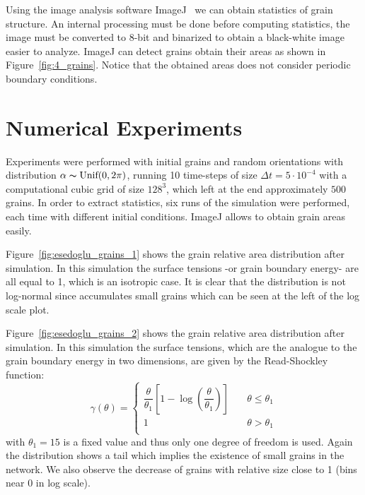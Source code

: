 Using the image analysis software ImageJ~\cite{schneider2012nih} we can obtain statistics of grain structure. 
An internal processing must be done before computing statistics, the image must be converted to 8-bit and binarized to obtain a black-white image easier to analyze. 
ImageJ can detect grains obtain their areas as shown in Figure~\ref{fig:4_grains}. 
Notice that the obtained areas does not consider periodic boundary conditions.

\section{Numerical Experiments}

Experiments were performed with  initial grains and  random orientations with distribution $\alpha \thicksim \text{Unif}(0,2\pi)$, running 10 time-steps of size $\Delta t = 5\cdot10^{-4}$ with a computational cubic grid of size $128^3$, which left at the end approximately $500$ grains. 
In order to extract statistics, six runs of the simulation were performed, each time with different initial conditions. 
ImageJ allows to obtain grain areas easily.

Figure~\ref{fig:esedoglu_grains_1} shows the grain relative area distribution after simulation. 
In this simulation the surface tensions -or grain boundary energy- are all equal to 1, which is an isotropic case. 
It is clear that the distribution is not log-normal since accumulates small grains which can be seen at the left of the log scale plot.

Figure~\ref{fig:esedoglu_grains_2} shows the grain relative area distribution after simulation. In this simulation the surface tensions, which are the analogue to the grain boundary energy in two dimensions, are given by the Read-Shockley function:
\begin{equation*}
    \gamma(\theta) = \begin{cases}
       \dfrac{\theta}{\theta_1} \left[1-\log\left(\dfrac{\theta}{\theta_1}\right)\right] & \quad \theta \leq \theta_1\\
        1 & \quad  \theta > \theta_1\\ 
     \end{cases}
\end{equation*}
with $\theta_1 = 15$ is a fixed value and thus only one degree of freedom is used. Again the distribution shows a tail which implies the existence of small grains in the network. We also observe the decrease of grains with relative size close to 1 (bins near 0 in log scale).

